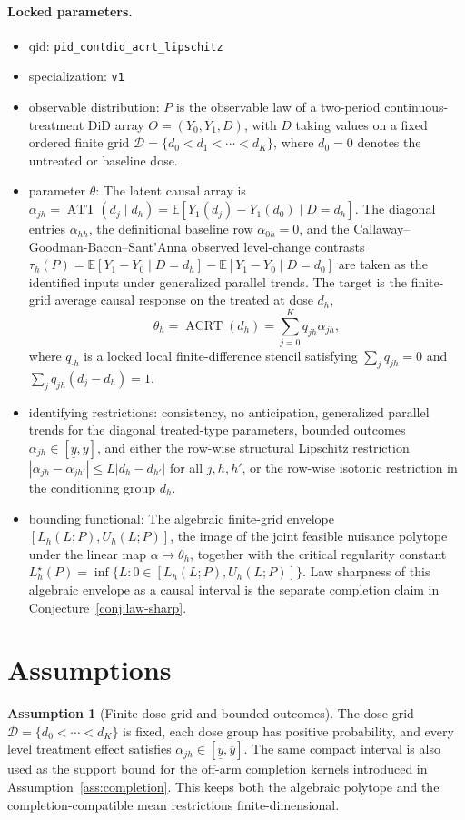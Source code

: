 \documentclass[11pt]{article}
\newcommand{\E}{\mathbb{E}}
\theoremstyle{definition}
\newtheorem{assumption}{Assumption}
\theoremstyle{plain}
\theoremstyle{remark}
\begin{document}
\paragraph{Locked parameters.}
\begin{itemize}
  \item qid: \texttt{pid\_contdid\_acrt\_lipschitz}
  \item specialization: \texttt{v1}
  \item observable distribution: \(P\) is the observable law of a two-period continuous-treatment DiD array \(O=(Y_0,Y_1,D)\), with \(D\) taking values on a fixed ordered finite grid \(\mathcal D=\{d_0<d_1<\cdots<d_K\}\), where \(d_0=0\) denotes the untreated or baseline dose.
  \item parameter \(\theta\): The latent causal array is \(\alpha_{j h}=\operatorname{ATT}(d_j\mid d_h)=\E[Y_1(d_j)-Y_1(d_0)\mid D=d_h]\).  The diagonal entries \(\alpha_{h h}\), the definitional baseline row \(\alpha_{0h}=0\), and the Callaway--Goodman-Bacon--Sant'Anna observed level-change contrasts \(\tau_h(P)=\E[Y_1-Y_0\mid D=d_h]-\E[Y_1-Y_0\mid D=d_0]\) are taken as the identified inputs under generalized parallel trends.  The target is the finite-grid average causal response on the treated at dose \(d_h\),
  \[
    \theta_h=\operatorname{ACRT}(d_h)
    =\sum_{j=0}^K q_{j h}\alpha_{j h},
  \]
  where \(q_{\cdot h}\) is a locked local finite-difference stencil satisfying \(\sum_jq_{j h}=0\) and \(\sum_jq_{j h}(d_j-d_h)=1\).
  \item identifying restrictions: consistency, no anticipation, generalized parallel trends for the diagonal treated-type parameters, bounded outcomes \(\alpha_{j h}\in[\underline y,\overline y]\), and either the row-wise structural Lipschitz restriction \(|\alpha_{j h}-\alpha_{j h'}|\le L|d_h-d_{h'}|\) for all \(j,h,h'\), or the row-wise isotonic restriction in the conditioning group \(d_h\).
  \item bounding functional: The algebraic finite-grid envelope \([L_h(L;P),U_h(L;P)]\), the image of the joint feasible nuisance polytope under the linear map \(\alpha\mapsto\theta_h\), together with the critical regularity constant \(L_h^\star(P)=\inf\{L:0\in[L_h(L;P),U_h(L;P)]\}\).  Law sharpness of this algebraic envelope as a causal interval is the separate completion claim in Conjecture~\ref{conj:law-sharp}.
\end{itemize}

\section{Assumptions}
\begin{assumption}[Finite dose grid and bounded outcomes]\label{ass:grid-bounds}
The dose grid \(\mathcal D=\{d_0<\cdots<d_K\}\) is fixed, each dose group has
positive probability, and every level treatment effect satisfies
\(\alpha_{j h}\in[\underline y,\overline y]\).  The same compact interval is
also used as the support bound for the off-arm completion kernels introduced
in Assumption~\ref{ass:completion}.  This keeps both the algebraic polytope and
the completion-compatible mean restrictions finite-dimensional.
\end{assumption}
\end{document}
